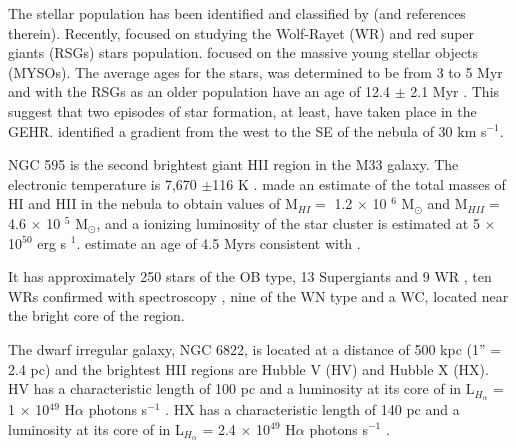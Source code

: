 \documentclass[fleqn,usenatbib, useAMS, a4paper]{mnras}
\begin{document}
The stellar population has been identified and classified by \citet{1996ApJ...456..174H} (and references therein).
Recently, \citet{2011MNRAS.411..235E} focused on studying the Wolf-Rayet (WR) and red super giants (RSGs) stars population.
\citet{2012AJ....143...43F} focused on the massive young stellar objects (MYSOs).
 The average ages for the stars, was determined to be from 3 to 5 Myr \citep{1996ApJ...456..174H} and with the RSGs as an older population have an age of 12.4 $\pm$ 2.1 Myr \citep{2011MNRAS.411..235E}.
This suggest that two episodes of star formation, at least, have taken place in the GEHR.
\citep{1984A&A...141...49H} identified a gradient from the west to the SE of the nebula of 30 km s$^{-1}$.

NGC 595 is the second brightest giant HII region in the M33 galaxy.
The electronic temperature is 7,670 $\pm$116 K \citep{2010MNRAS.402.1635R}.
\citet{1983A&A...119..185V} made an estimate of the total masses of HI and HII in the nebula to obtain values of M$_{HI}=$ 1.2 $\times$ 10 $^{6}$ M$_{\odot}$ and M$_{HII} =$ 4.6 $\times$ 10 $^{5}$ M$_{\odot}$, and a ionizing luminosity of the star cluster is estimated at 5 $\times$ 10$^{50}$ erg s $^{1}$.
\citet{1996AJ....111.1128M} estimate an age of 4.5 Myrs consistent with \citet{1993AJ....105.1400D}.


It has approximately 250 stars of the OB type, 13 Supergiants and 9 WR \citep{1996AJ....111.1128M}, ten WRs confirmed with spectroscopy \citet{1993AJ....105.1400D}, nine of the WN type and a WC, located near the bright core of the region.

The dwarf irregular galaxy, NGC 6822, is located at a distance of 500 kpc (1'' = 2.4 pc) \citep{1996AJ....112.1928G} and the brightest HII regions are Hubble V (HV) and Hubble X (HX).
HV has a characteristic length of 100 pc and a luminosity at its core of in L$_{H_\alpha}$ = 1 $\times$ 10$^{49}$ H$\alpha$ photons s$^{-1}$ \citep{1999PASP..111.1382O}.
HX has a characteristic length of 140 pc and a luminosity at its core of in L$_{H_\alpha}$ = 2.4 $\times$ 10$^{49}$ H$\alpha$ photons s$^{-1}$ \citep{1999PASP..111.1382O}.

\end{document}
